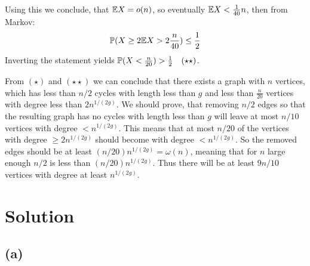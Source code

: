 \documentclass[a4paper]{article}
\begin{document}
Using this we conclude, that $ \E X = o(n) $, so eventually $ \E
X < \frac{1}{40}n $, then from Markov:
$$
  \P(X \ge 2 \E X > 2 \frac{n}{40}) \le \frac{1}{2}
$$
Inverting the statement yields $ \P(X < \frac{n}{20}) > \frac{1}{2} \quad (\star\star)$.

From $ (\star) $ and $ (\star\star) $ we can conclude that there exists a graph
with $ n $ vertices, which has less than $ n/2 $ cycles with length less than
$ g $ and less than $ \frac{n}{20} $ vertices with degree less than
$ 2n^{1/(2g)} $. We should prove, that removing $ n / 2 $ edges so that the
resulting graph has no cycles with length less than $ g $ will leave at most
$ n / 10 $ vertices with degree $ < n^{1/(2g)} $. This means that at most
$ n / 20 $ of the vertices with degree $ \ge 2n^{1/(2g)} $ should become with
degree $ < n^{1/(2g)} $. So the removed edges should be at least $ (n/20)
n^{1/(2g)} = \omega(n) $, meaning that for $ n $ large enough $ n/2 $ is
less than $ (n/20) n^{1/(2g)} $. Thus there will be at least $ 9n/10 $ vertices
with degree at least $ n^{1/(2g)} $.



\section{Solution}
  \subsection*{(a)}
\end{document}
